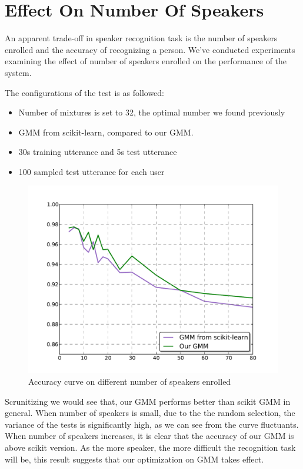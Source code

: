 \section{Effect On Number Of Speakers}
An apparent trade-off in speaker recognition task is the number of speakers
enrolled and the accuracy of recognizing a person. We've conducted experiments
examining the effect of number of speakers enrolled on the performance of the
system.

The configurations of the test is as followed:
\begin{itemize}
	\item Number of mixtures is set to 32, the optimal number we found previously
	\item GMM from scikit-learn, compared to our GMM.
	\item 30s training utterance and 5s test utterance
	\item 100 sampled test utterance for each user
\end{itemize}


\begin{figure}[!ht]
	\centering
	\includegraphics[width=\linewidth]{res/nperson.pdf}
	\caption{Accuracy curve on different number of speakers enrolled\label{fig:nspk_enrolled}}
\end{figure}

Scrunitizing  we would see that, our GMM performs better than
scikit GMM in general. When number of speakers is small, due to the the random
selection, the variance of the tests is significantly high, as we can see from the curve fluctuants.
When number of speakers increases, it is clear that the
accuracy of our GMM is above scikit version. As the more speaker, the more
difficult the recognition task will be, this result suggests that our
optimization on GMM takes effect.


